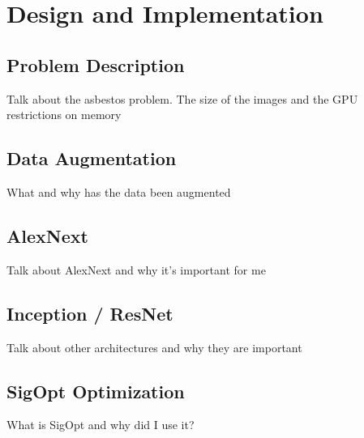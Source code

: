 \chapter{Design and Implementation}


\section{Problem Description}

Talk about the asbestos problem. The size of the images and the GPU restrictions on memory

\section{Data Augmentation}

What and why has the data been augmented

\section{AlexNext}

Talk about AlexNext and why it's important for me

\section{Inception / ResNet}

Talk about other architectures and why they are important

\section{SigOpt Optimization}

What is SigOpt and why did I use it?
